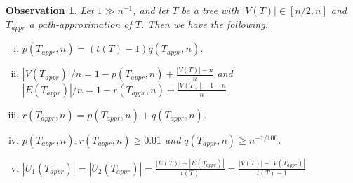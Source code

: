 \documentclass[a4paper,11pt,hidelinks]{amsart}
\newtheorem{observation}[theorem]{Observation}
\theoremstyle{definition}
\begin{document}
\begin{observation}\label{Observation_path-like}
Let $1\gg n^{-1}$, and let $T$ be a  tree with $|V(T)|\in[n/2, n]$ and $T_{appr}$ a path-approximation of $T$. Then we have the following.
\begin{enumerate}[(i)]
\item  $p(T_{appr},n)=(t(T)-1)q(T_{appr},n)$.
\item $|V(T_{appr})|/n=1-p(T_{appr},n) +\frac{|V(T)|-n}n$ and $|E(T_{appr})|/n=1-r(T_{appr},n) +\frac{|V(T)|-1-n}n$ 
\item $r(T_{appr},n)=p(T_{appr},n)+q(T_{appr},n)$.
\item $p(T_{appr},n), r(T_{appr},n) \geq 0.01$  and $q(T_{appr},n)\geq n^{-1/100}$.
\item $|U_1(T_{appr})|=|U_2(T_{appr})|=\frac{|E(T)|-|E(T_{appr})|}{t(T)}=\frac{|V(T)|-|V(T_{appr})|}{t(T)-1}$
\end{enumerate}
\end{observation}


 
\end{document}
